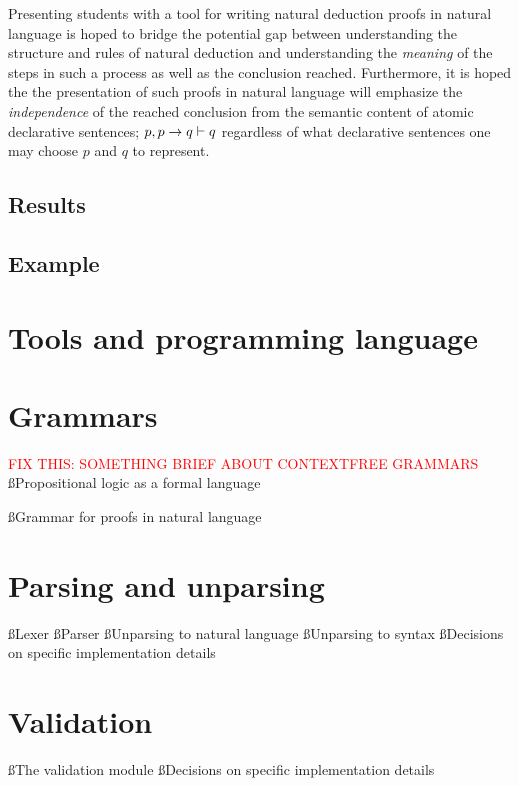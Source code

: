 \documentclass[a4paper]{article}
\newcommand{\FIX}[1]{\textcolor{Red}{FIX THIS: #1}}
\begin{document}
    Presenting students with a tool for writing natural deduction proofs
    in natural language is hoped to bridge the potential gap between
    understanding the structure and rules of natural deduction and
    understanding the \emph{meaning} of the steps in such a process as well
    as the conclusion reached. Furthermore, it is hoped the the
    presentation of such proofs in natural language will emphasize the
    \emph{independence} of the reached conclusion from the semantic 
    content of atomic declarative sentences; \(p, p \rightarrow q \vdash q\)
    regardless
    of what declarative sentences one may choose $p$ and $q$ to represent.

\subsection{Results}

\subsection{Example}

\section{Tools and programming language} %

\newpage

\section{Grammars}
\FIX{SOMETHING BRIEF ABOUT CONTEXTFREE GRAMMARS}
\ss{Propositional logic as a formal language}


\ss{Grammar for proofs in natural language}




\section{Parsing and unparsing}
\ss{Lexer}
\ss{Parser}
\ss{Unparsing to natural language}
\ss{Unparsing to  syntax}
\ss{Decisions on specific implementation details}

\section{Validation}
\ss{The validation module}
\ss{Decisions on specific implementation details}
\end{document}
